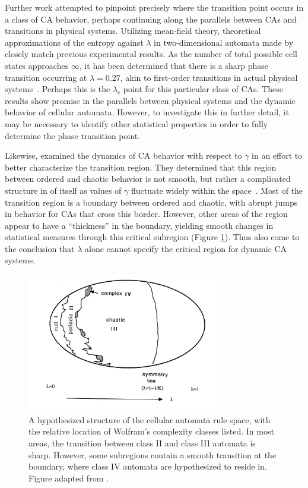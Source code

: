\documentclass[a4paper,11pt,twoside]{report}
\begin{document}
Further work attempted to pinpoint precisely where the transition point occurs in a class of CA behavior, perhaps continuing along the parallels between CAs and transitions in physical systems. Utilizing mean-field theory, theoretical approximations of the entropy against $\lambda$ in two-dimensional automata made by \citeauthor{wo90} closely match previous experimental results. As the number of total possible cell states approaches $\infty$, it has been determined that there is a sharp phase transition occurring at $\lambda=0.27$, akin to first-order transitions in actual physical systems~\cite{wo90}. Perhaps this is the $\lambda_c$ point for this particular class of CAs. These results show promise in the parallels between physical systems and the dynamic behavior of cellular automata. However, to investigate this in further detail, it may be necessary to identify other statistical properties in order to fully determine the phase transition point.

Likewise, \citeauthor{li90b} examined the dynamics of CA behavior with respect to $\gamma$ in an effort to better characterize the transition region. They determined that this region between ordered and chaotic behavior is not smooth, but rather a complicated structure in of itself as values of $\gamma$ fluctuate widely within the space~\cite{li90b}. Most of the transition region is a boundary between ordered and chaotic, with abrupt jumps in behavior for CAs that cross this border. However, other areas of the region appear to have a ``thickness'' in the boundary, yielding smooth changes in statistical measures through this critical subregion (Figure \ref{fig:ca_space}). Thus \citeauthor{li90b} also come to the conclusion that $\lambda$ alone cannot specify the critical region for dynamic CA systems.

\begin{figure}[htp]
\centering
\includegraphics[width=0.75\textwidth]{li90b_fig11.png}
\caption[Hypothesized CA Space]{
A hypothesized structure of the cellular automata rule space, with the relative location of Wolfram's complexity classes listed. In most areas, the transition between class II and class III automata is sharp. However, some subregions contain a smooth transition at the boundary, where class IV automata are hypothesized to reside in. Figure adapted from \citeauthor{li90b} \cite{li90b}.
}
\label{fig:ca_space}
\end{figure}
\end{document}
